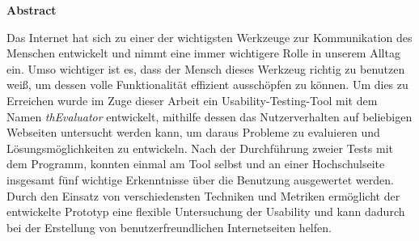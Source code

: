 
\vspace*{2cm}

\begin{center}
    \textbf{Abstract}
\end{center}

\vspace*{1cm}

\noindent Das Internet hat sich zu einer der wichtigsten Werkzeuge zur Kommunikation des Menschen entwickelt und nimmt eine immer wichtigere Rolle in unserem Alltag ein. Umso wichtiger ist es, dass der Mensch dieses Werkzeug richtig zu benutzen weiß, um dessen volle Funktionalität effizient ausschöpfen zu können. Um dies zu Erreichen wurde im Zuge dieser Arbeit ein Usability-Testing-Tool mit dem Namen \textit{thEvaluator} entwickelt, mithilfe dessen das Nutzerverhalten auf beliebigen Webseiten untersucht werden kann, um daraus Probleme zu evaluieren und Lösungsmöglichkeiten zu entwickeln. Nach der Durchführung zweier Tests mit dem Programm, konnten einmal am Tool selbst und an einer Hochschulseite insgesamt fünf wichtige Erkenntnisse über die Benutzung ausgewertet werden. Durch den Einsatz von verschiedensten Techniken und Metriken ermöglicht der entwickelte Prototyp eine flexible Untersuchung der Usability und kann dadurch bei der Erstellung von benutzerfreundlichen Internetseiten helfen.
